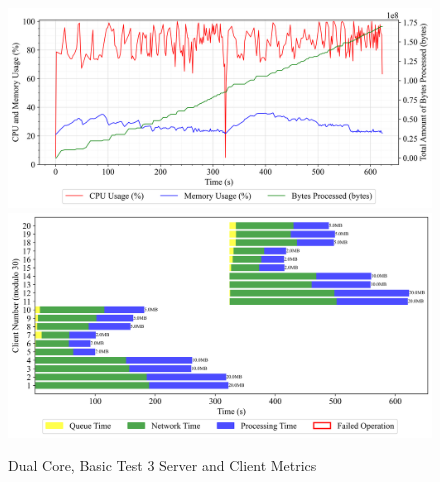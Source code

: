 \newpage
\begin{figure}[h!t]
    \begin{center}
    \label{Fig:A1.7}
    \caption{Dual Core, Basic Test 3 Server and Client Metrics}
    \includegraphics[width=\xLarge\textwidth]{Chapter4/Results/2c_results/arty-a7-2c_basic_3_20241003_152340.db_server_metrics.png}
    \includegraphics[width=\xLarge\textwidth]{Chapter4/Results/2c_results/arty-a7-2c_basic_3_20241003_152340.db_client_tasks.png}
    \end{center}
\end{figure}

